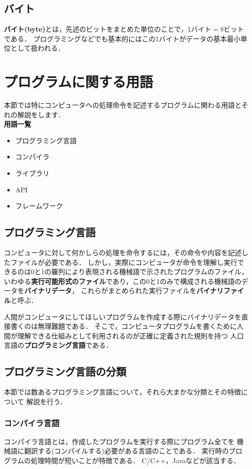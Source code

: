 \documentclass[autodetect-engine,dvi=dvipdfmx,ja=standard,a4j]{bxjsarticle}
\begin{document}
\subsection{バイト}
\textbf{バイト(byte)}とは，先述のビットをまとめた単位のことで，1バイト$=$8ビットである．
プログラミングなどでも基本的にはこの1バイトがデータの基本最小単位として扱われる．

\section{プログラムに関する用語} \label{sec:program-knowledge}
本節では特にコンピュータへの処理命令を記述するプログラムに関わる用語とそれの解説をします．\\

\textbf{用語一覧}
\begin{itemize}
    \item プログラミング言語
    \item コンパイラ
    \item ライブラリ
    \item API
    \item フレームワーク
\end{itemize}

\subsection{プログラミング言語}
コンピュータに対して何かしらの処理を命令するには，その命令や内容を記述したファイルが必要である．
しかし，実際にコンピュータが命令を理解し実行できるのは0と1の羅列により表現される機械語で示されたプログラムのファイル，
いわゆる\textbf{実行可能形式のファイル}であり，この0と1のみで構成される機械語のデータを\textbf{バイナリデータ}，
これらがまとめられた実行ファイルを\textbf{バイナリファイル}と呼ぶ．

人間がコンピュータにしてほしいプログラムを作成する際にバイナリデータを直接書くのは無理難題である．
そこで，コンピュータプログラムを書くために人間が理解できる仕組みとして利用されるのが正確に定義された規則を持つ
人口言語の\textbf{プログラミング言語}である．

\subsection{プログラミング言語の分類}
本節では数あるプログラミング言語について，それら大まかな分類とその特徴について
解説を行う．

\subsubsection{コンパイラ言語}
コンパイラ言語とは，作成したプログラムを実行する際にプログラム全てを
機械語に翻訳する(コンパイルする)必要がある言語のことである．
実行時のプログラムの処理時間が短いことが特徴である．
C/C++，Javaなどが該当する．
\end{document}
